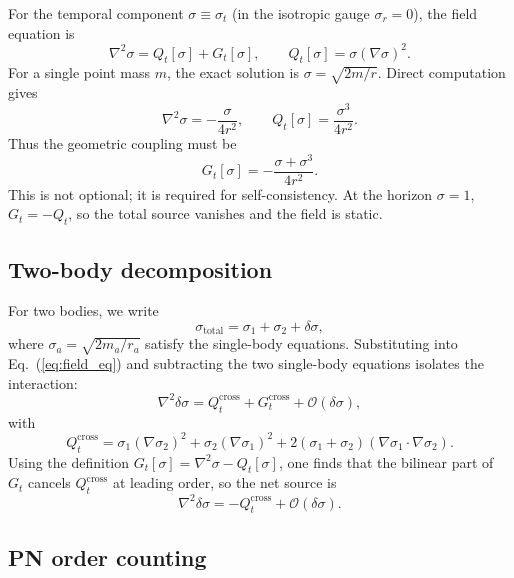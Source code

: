 \documentclass[12pt,prd,preprintnumbers,amsmath,amssymb]{revtex4-2}
\begin{document}
For the temporal component $\sigma \equiv \sigma_t$ (in the isotropic gauge $\sigma_r=0$), the field equation is
\begin{equation}
\nabla^2\sigma = Q_t[\sigma] + G_t[\sigma], \qquad Q_t[\sigma] = \sigma(\nabla\sigma)^2.
\label{eq:field_eq}
\end{equation}
For a single point mass $m$, the exact solution is $\sigma = \sqrt{2m/r}$. Direct computation gives
\begin{equation}
\nabla^2\sigma = -\frac{\sigma}{4r^2}, \qquad Q_t[\sigma] = \frac{\sigma^3}{4r^2}.
\end{equation}
Thus the geometric coupling must be
\begin{equation}
\boxed{G_t[\sigma] = -\frac{\sigma + \sigma^3}{4r^2}.}
\label{eq:Gt_single}
\end{equation}
This is not optional; it is required for self-consistency. At the horizon $\sigma=1$, $G_t = -Q_t$, so the total source vanishes and the field is static.

\subsection{Two-body decomposition}

For two bodies, we write
\begin{equation}
\sigma_{\text{total}} = \sigma_1 + \sigma_2 + \delta\sigma,
\end{equation}
where $\sigma_a = \sqrt{2m_a/r_a}$ satisfy the single-body equations. Substituting into Eq.~(\ref{eq:field_eq}) and subtracting the two single-body equations isolates the interaction:
\begin{equation}
\nabla^2\delta\sigma = Q_t^{\mathrm{cross}} + G_t^{\mathrm{cross}} + \mathcal{O}(\delta\sigma),
\end{equation}
with
\begin{equation}
Q_t^{\mathrm{cross}} = \sigma_1(\nabla\sigma_2)^2 + \sigma_2(\nabla\sigma_1)^2 + 2(\sigma_1+\sigma_2)(\nabla\sigma_1\!\cdot\!\nabla\sigma_2).
\end{equation}
Using the definition $G_t[\sigma] = \nabla^2\sigma - Q_t[\sigma]$, one finds that the bilinear part of $G_t$ cancels $Q_t^{\mathrm{cross}}$ at leading order, so the net source is
\begin{equation}
\nabla^2\delta\sigma = -Q_t^{\mathrm{cross}} + \mathcal{O}(\delta\sigma).
\label{eq:source}
\end{equation}

\subsection{PN order counting}
\end{document}
